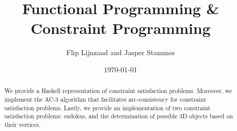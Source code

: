 \documentclass[12pt,a4paper]{article}
\title{Functional Programming \& Constraint Programming}
\author{Flip Lijnzaad and Jasper Stammes}
\date{\today}
\begin{document}
\maketitle

\begin{abstract}
We provide a Haskell representation of constraint satisfaction problems.
Moreover, we implement the AC-3 algorithm that facilitates arc-consistency for constraint satisfaction problems.
Lastly, we provide an implementation of two constraint satisfaction problems:
sudokus, and
the determination of possible 3D objects based on their vertices.
\end{abstract}

\vfill

\tableofcontents

\clearpage
















\newpage
\appendix




\end{document}
